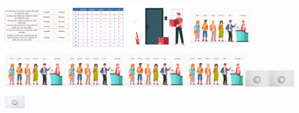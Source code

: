 \begin{escolha}
\begin{escolha}
{{{{{{{{\includegraphics[width=1.10972in,height=0.74212in]{media/image109.png}\includegraphics[width=1.01042in,height=0.67572in]{media/image111.png}\includegraphics[width=1.09268in,height=0.73073in]{media/image112.png}\includegraphics[width=1.04264in,height=0.69727in]{media/image113.png}\includegraphics[width=1.04264in,height=0.69727in]{media/image113.png}\includegraphics[width=1.04264in,height=0.69727in]{media/image113.png}\includegraphics[width=1.04264in,height=0.69727in]{media/image113.png}\includegraphics[width=1.04264in,height=0.69727in]{media/image113.png}\includegraphics[width=0.41851in,height=0.40455in]{media/image168.png}\includegraphics[width=0.41851in,height=0.40455in]{media/image168.png}\includegraphics[width=0.34170in,height=0.31303in]{media/image169.jpeg}\incl}}}}}}}}
\end{escolha}
\end{escolha}
